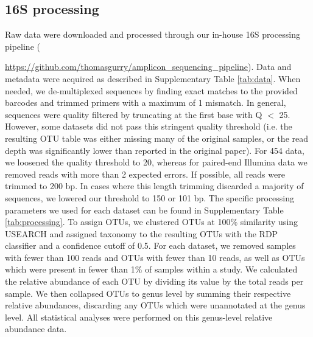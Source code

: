 \subsection*{16S processing}
Raw data were downloaded and processed through our in-house 16S processing pipeline ({\url{ https://github.com/thomasgurry/amplicon_sequencing_pipeline}).
Data and metadata were acquired as described in Supplementary Table \ref{tab:data}.
When needed, we de-multiplexed sequences by finding exact matches to the provided barcodes and trimmed primers with a maximum of 1 mismatch.
In general, sequences were quality filtered by truncating at the first base with Q $<$ 25.
However, some datasets did not pass this stringent quality threshold (i.e. the resulting OTU table was either missing many of the original samples, or the read depth was significantly lower than reported in the original paper).
For 454 data, we loosened the quality threshold to 20, whereas for paired-end Illumina data we removed reads with more than 2 expected errors.
If possible, all reads were trimmed to 200 bp.
In cases where this length trimming discarded a majority of sequences, we lowered our threshold to 150 or 101 bp.
The specific processing parameters we used for each dataset can be found in Supplementary Table \ref{tab:processing}.
To assign OTUs, we clustered OTUs at 100\% similarity using USEARCH \cite{edgar-usearch-2010} and assigned taxonomy to the resulting OTUs with the RDP classifier \cite{wang2007naive} and a confidence cutoff of 0.5.
For each dataset, we removed samples with fewer than 100 reads and OTUs with fewer than 10 reads, as well as OTUs which were present in fewer than 1\% of samples within a study.
We calculated the relative abundance of each OTU by dividing its value by the total reads per sample.
We then collapsed OTUs to genus level by summing their respective relative abundances, discarding any OTUs which were unannotated at the genus level.
All statistical analyses were performed on this genus-level relative abundance data.

}
